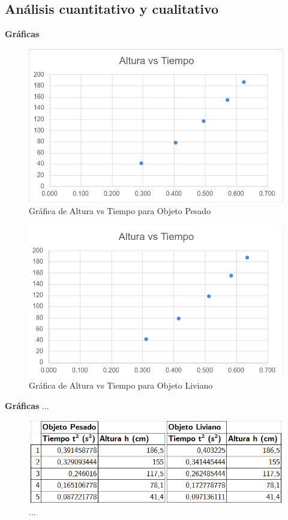 \begin{multicols}{2}
\section*{Análisis cuantitativo y cualitativo} 
\textbf{Gráficas}
        \begin{figure}[H]
            \centering
            \includegraphics[scale=0.5]{fig/objPesado-Altura-Tiempo.png}
            \caption{Gráfica de Altura vs Tiempo para Objeto Pesado}
        \end{figure}
        
        \begin{figure}[H]
            \centering
            \includegraphics[scale=0.5]{fig/objLiviano-Altura-Tiempo.png}
            \caption{Gráfica de Altura vs Tiempo para Objeto Liviano}
        \end{figure}
\textbf{Gráficas}
...
\begin{figure}[H]
    \centering
    \includegraphics[scale=0.5]{fig/Tabla3-TiempoCuadrado.png}
    \caption{...}
\end{figure}



\end{multicols}
